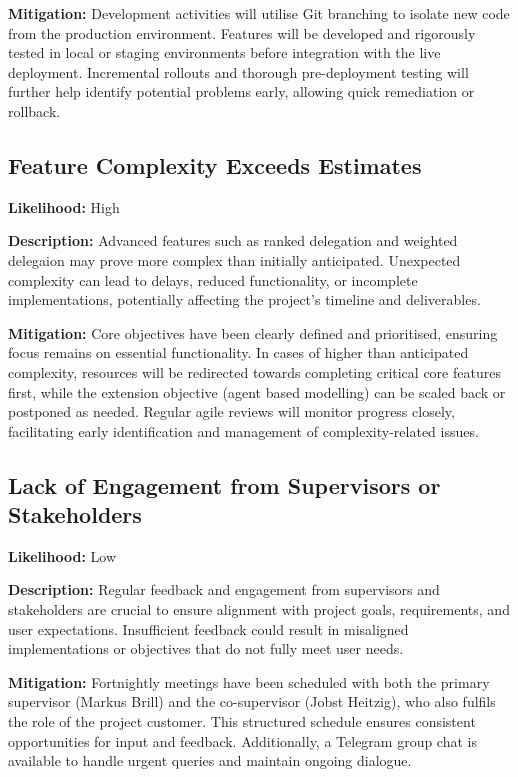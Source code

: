 \textbf{Mitigation:} Development activities will utilise Git branching to isolate new code from the production environment. Features will be developed and rigorously tested in local or staging environments before integration with the live deployment. Incremental rollouts and thorough pre-deployment testing will further help identify potential problems early, allowing quick remediation or rollback.

\subsection*{Feature Complexity Exceeds Estimates}

\textbf{Likelihood:} High

\textbf{Description:} Advanced features such as ranked delegation and weighted delegaion may prove more complex than initially anticipated. Unexpected complexity can lead to delays, reduced functionality, or incomplete implementations, potentially affecting the project's timeline and deliverables.

\textbf{Mitigation:} Core objectives have been clearly defined and prioritised, ensuring focus remains on essential functionality. In cases of higher than anticipated complexity, resources will be redirected towards completing critical core features first, while the extension objective (agent based modelling) can be scaled back or postponed as needed. Regular agile reviews will monitor progress closely, facilitating early identification and management of complexity-related issues.

\subsection*{Lack of Engagement from Supervisors or Stakeholders}

\textbf{Likelihood:} Low

\textbf{Description:} Regular feedback and engagement from supervisors and stakeholders are crucial to ensure alignment with project goals, requirements, and user expectations. Insufficient feedback could result in misaligned implementations or objectives that do not fully meet user needs.

\textbf{Mitigation:} Fortnightly meetings have been scheduled with both the primary supervisor (Markus Brill) and the co-supervisor (Jobst Heitzig), who also fulfils the role of the project customer. This structured schedule ensures consistent opportunities for input and feedback. Additionally, a Telegram group chat is available to handle urgent queries and maintain ongoing dialogue.

